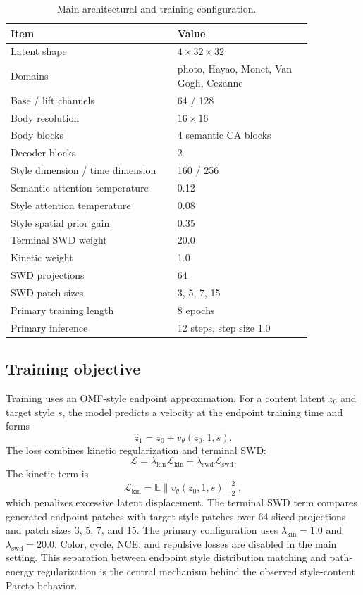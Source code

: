 ﻿\documentclass[letterpaper]{article}
\begin{document}
\begin{table}[t]
\centering
\caption{Main architectural and training configuration.}
\label{tab:config}
\begin{tabular}{@{}p{0.47\linewidth}p{0.38\linewidth}@{}}
\toprule
Item & Value \\
\midrule
Latent shape & $4 \times 32 \times 32$ \\
Domains & photo, Hayao, Monet, Van Gogh, Cezanne \\
Base / lift channels & 64 / 128 \\
Body resolution & $16 \times 16$ \\
Body blocks & 4 semantic CA blocks \\
Decoder blocks & 2 \\
Style dimension / time dimension & 160 / 256 \\
Semantic attention temperature & 0.12 \\
Style attention temperature & 0.08 \\
Style spatial prior gain & 0.35 \\
Terminal SWD weight & 20.0 \\
Kinetic weight & 1.0 \\
SWD projections & 64 \\
SWD patch sizes & 3, 5, 7, 15 \\
Primary training length & 8 epochs \\
Primary inference & 12 steps, step size 1.0 \\
\bottomrule
\end{tabular}
\end{table}

\subsection{Training objective}
Training uses an OMF-style endpoint approximation. For a content latent $z_0$ and target style $s$, the model predicts a velocity at the endpoint training time and forms
\begin{equation}
    \hat{z}_1 = z_0 + v_\theta(z_0,1,s).
\end{equation}
The loss combines kinetic regularization and terminal SWD:
\begin{equation}
    \mathcal{L} = \lambda_{\mathrm{kin}}\mathcal{L}_{\mathrm{kin}} + \lambda_{\mathrm{swd}}\mathcal{L}_{\mathrm{swd}}.
\end{equation}
The kinetic term is
\begin{equation}
    \mathcal{L}_{\mathrm{kin}} = \mathbb{E}\|v_\theta(z_0,1,s)\|_2^2,
\end{equation}
which penalizes excessive latent displacement. The terminal SWD term compares generated endpoint patches with target-style patches over 64 sliced projections and patch sizes 3, 5, 7, and 15. The primary configuration uses $\lambda_{\mathrm{kin}}=1.0$ and $\lambda_{\mathrm{swd}}=20.0$. Color, cycle, NCE, and repulsive losses are disabled in the main setting. This separation between endpoint style distribution matching and path-energy regularization is the central mechanism behind the observed style-content Pareto behavior.
\end{document}
